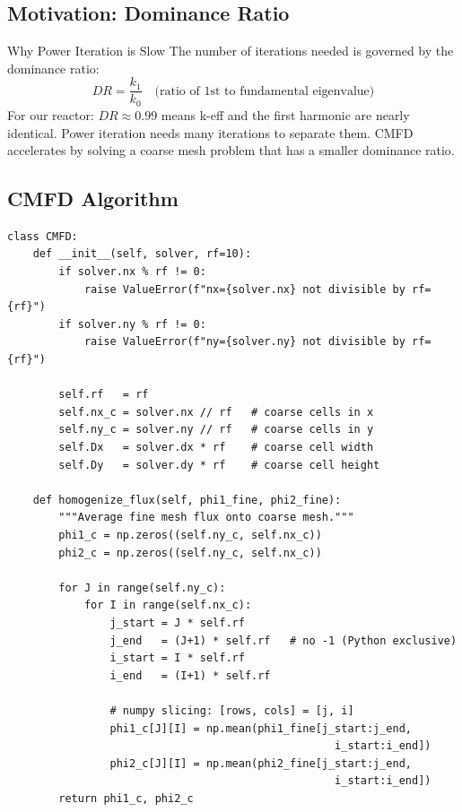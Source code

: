 \documentclass[12pt,a4paper]{article}
\begin{document}
\subsection{Motivation: Dominance Ratio}

\begin{physicsbox}{Why Power Iteration is Slow}
The number of iterations needed is governed by the dominance ratio:
\begin{equation}
DR = \frac{k_1}{k_0} \quad \text{(ratio of 1st to fundamental eigenvalue)}
\end{equation}
For our reactor: $DR \approx 0.99$ means k-eff and the first harmonic are
nearly identical. Power iteration needs many iterations to separate them.
CMFD accelerates by solving a coarse mesh problem that has a smaller
dominance ratio.
\end{physicsbox}

\subsection{CMFD Algorithm}

\begin{lstlisting}[caption={CMFD Flux Homogenization}]
class CMFD:
    def __init__(self, solver, rf=10):
        if solver.nx % rf != 0:
            raise ValueError(f"nx={solver.nx} not divisible by rf={rf}")
        if solver.ny % rf != 0:
            raise ValueError(f"ny={solver.ny} not divisible by rf={rf}")

        self.rf   = rf
        self.nx_c = solver.nx // rf   # coarse cells in x
        self.ny_c = solver.ny // rf   # coarse cells in y
        self.Dx   = solver.dx * rf    # coarse cell width
        self.Dy   = solver.dy * rf    # coarse cell height

    def homogenize_flux(self, phi1_fine, phi2_fine):
        """Average fine mesh flux onto coarse mesh."""
        phi1_c = np.zeros((self.ny_c, self.nx_c))
        phi2_c = np.zeros((self.ny_c, self.nx_c))

        for J in range(self.ny_c):
            for I in range(self.nx_c):
                j_start = J * self.rf
                j_end   = (J+1) * self.rf   # no -1 (Python exclusive)
                i_start = I * self.rf
                i_end   = (I+1) * self.rf

                # numpy slicing: [rows, cols] = [j, i]
                phi1_c[J][I] = np.mean(phi1_fine[j_start:j_end,
                                                   i_start:i_end])
                phi2_c[J][I] = np.mean(phi2_fine[j_start:j_end,
                                                   i_start:i_end])
        return phi1_c, phi2_c
\end{lstlisting}
\end{document}

